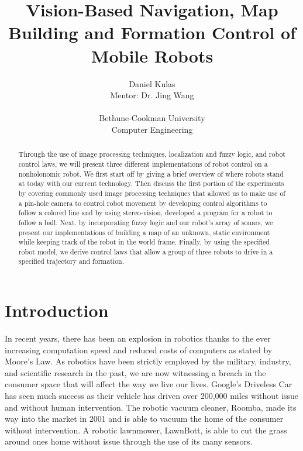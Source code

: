 \documentclass[12pt]{article}
\title{Vision-Based Navigation, Map Building and Formation Control of Mobile Robots}
\author{Daniel Kulas\\
Mentor: Dr. Jing Wang\\ \\
Bethune-Cookman University\\Computer Engineering}
\begin{document}
\maketitle


\newpage
\begin{abstract}

Through the use of image processing techniques, localization and fuzzy logic, and robot control laws, we will present three different implementations of robot control on a nonholonomic robot. We first start off by giving a brief overview of where robots stand at today with our current technology. Then discuss the first portion of the experiments by covering commonly used image processing techniques that allowed us to make use of a pin-hole camera to control robot movement by developing control algorithms to follow a colored line and by using stereo-vision, developed a program for a robot to follow a ball. Next, by incorporating fuzzy logic and our robot's array of sonars, we present our implementations of building a map of an unknown, static environment while keeping track of the robot in the world frame. Finally, by using the specified robot model, we derive control laws that allow a group of three robots to drive in a specified trajectory and formation.

\end{abstract}


\newpage

\tableofcontents

\newpage

\listoffigures

\newpage

\section{Introduction}
In recent years, there has been an explosion in robotics thanks to the ever increasing computation speed and reduced costs of computers as stated by Moore's Law. As robotics have been strictly employed by the military, industry, and scientific research in the past, we are now witnessing a breach in the consumer space that will affect the way we live our lives. Google's Driveless Car has seen much success as their vehicle has driven over 200,000 miles without issue and without human intervention. The robotic vacuum cleaner, Roomba, made its way into the market in 2001 and is able to vacuum the home of the consumer without intervention. A robotic lawnmower, LawnBott, is able to cut the grass around ones home without issue through the use of its many sensors. 
\end{document}
